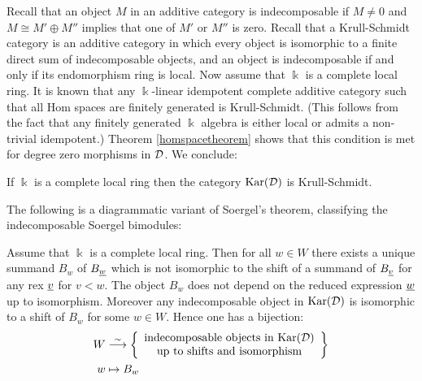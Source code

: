 Recall that an object $M$ in an additive category is indecomposable if $M \ne 0$ and $M \cong M' \oplus M''$ implies that one of $M'$ or $M''$ is zero. Recall that a Krull-Schmidt category is an additive category in which every object is isomorphic to a finite direct sum of indecomposable objects, and an object is indecomposable if and only if its endomorphism ring is local. Now assume that $\Bbbk$ is a complete local ring. It is known that any $\Bbbk$-linear idempotent complete additive category such that all Hom spaces are finitely generated is Krull-Schmidt. (This follows from the fact that any finitely generated $\Bbbk$ algebra is either local or admits a non-trivial idempotent.) Theorem \ref{homspacetheorem} shows that this condition is met for degree zero morphisms in ${\mathcal{D}}$. We conclude:

\begin{lemma}
  If $\Bbbk$ is a complete local ring then the category $\textrm{Kar}({\mathcal{D}})$ is Krull-Schmidt.
\end{lemma}

The following is a diagrammatic variant of Soergel's theorem, classifying the indecomposable Soergel bimodules:

\begin{thm} \label{SoergelReproof} 
Assume that $\Bbbk$ is a complete local ring. Then for all $w \in W$ there exists a unique summand $B_w$ of $B_{\underline{w}}$ which is not isomorphic to the shift of a summand of $B_{\underline{v}}$ for any rex $\underline{v}$ for $v < w$. The object $B_w$ does not depend on the reduced expression $\underline{w}$ up to isomorphism. Moreover any indecomposable object in $\textrm{Kar}({\mathcal{D}})$ is isomorphic to a shift of $B_w$ for some $w \in W$. Hence one has a bijection:
\begin{align*}
W & \stackrel{\sim}{\longrightarrow}
\left \{ \begin{array}{c}
\text{indecomposable objects in $\textrm{Kar}({\mathcal{D}})$} \\
\text{up to shifts and isomorphism}
\end{array} \right \} \\
w & \mapsto B_w
\end{align*}
\end{thm}

